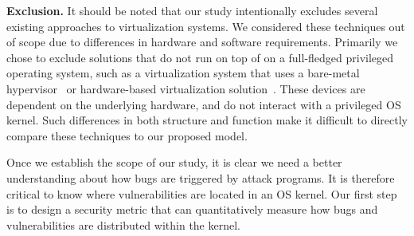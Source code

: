 \noindent
\textbf{Exclusion.}
It should be noted that our study intentionally excludes several existing
approaches to virtualization systems. We considered these techniques
out of scope due to differences in hardware and software requirements.
Primarily we chose to exclude solutions that do not run on top of on a full-fledged
privileged operating system, such as a virtualization system that uses a
bare-metal hypervisor~\cite{Xen-03} or hardware-based virtualization
solution~\cite{IntelVT}.
These devices are dependent on the underlying hardware, and do not interact
with a privileged OS kernel. Such differences in both structure and function
make it difficult to directly compare these techniques to our proposed model.

Once we establish the scope of our study, it is clear we need a better understanding about how
bugs are triggered by attack programs. It is therefore critical to know where
vulnerabilities are located in an OS kernel. Our first step is to design
a security metric that can quantitatively measure how bugs and vulnerabilities
are distributed within the kernel.
